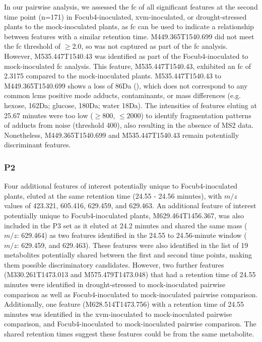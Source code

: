 In our pairwise analysis, we assessed the \acf{fc} of all significant features at the second time point (n=171) in \ac{Focub4}-inoculated, \ac{xvm}-inoculated, or drought-stressed plants to the mock-inoculated plants, as \ac{fc} can be used to indicate a relationship between features with a similar retention time. M449.365T1540.699 did not meet the \ac{fc} threshold of $\ge2.0$, so was not captured as part of the \ac{fc} analysis. However,  M535.447T1540.43 was identified as part of the \ac{Focub4}-inoculated to mock-inoculated \ac{fc} analysis. This feature, M535.447T1540.43, exhibited an \ac{fc} of 2.3175 compared to the mock-inoculated plants. M535.447T1540.43 to M449.365T1540.699 shows a loss of 86Da (), which does not correspond to any common \ac{lcms} positive mode adducts, contaminants, or mass differences (e.g. hexose, 162Da; glucose, 180Da; water 18Da). The intensities of features eluting at 25.67 minutes were too low ($\geq800$, $\leq2000$) to identify fragmentation patterns of adducts from noise (threshold 400), also resulting in the absence of MS2 data. Nonetheless, M449.365T1540.699 and M535.447T1540.43 remain potentially discriminant features.

\subsubsection{P2}

Four additional features of interest potentially unique to \ac{Focub4}-inoculated plants, eluted at the same retention time (24.55 - 24.56 minutes), with $m/z$ values of 423.321, 605.416, 629.459, and 629.463. An additional feature of interest potentially unique to \ac{Focub4}-inoculated plants, M629.464T1456.367, was also included in the P3 set as it eluted at 24.2 minutes and shared the same mass ($m/z$: 629.464) as two features identified in the 24.55 to 24.56-minute window ($m/z$: 629.459, and 629.463). These features were also identified in the list of 19 metabolites potentially shared between the first and second time points, making them possible discriminatory candidates. However, two further features (M330.261T1473.013 and M575.479T1473.048) that had a retention time of 24.55 minutes were identified in drought-stressed to mock-inoculated pairwise comparison as well as \ac{Focub4}-inoculated to mock-inoculated pairwise comparison. Additionally, one feature (M628.514T1473.756) with a retention time of 24.55 minutes was identified in the \ac{xvm}-inoculated to mock-inoculated pairwise comparison, and \ac{Focub4}-inoculated to mock-inoculated pairwise comparison. The shared retention times suggest these features could be from the same metabolite.

